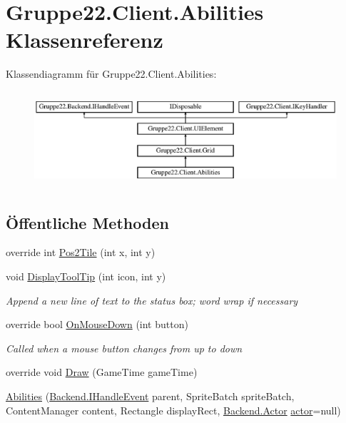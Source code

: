 \hypertarget{class_gruppe22_1_1_client_1_1_abilities}{\section{Gruppe22.\-Client.\-Abilities Klassenreferenz}
\label{class_gruppe22_1_1_client_1_1_abilities}
}
Klassendiagramm für Gruppe22.\-Client.\-Abilities\-:\begin{figure}[H]
\begin{center}
\leavevmode
\includegraphics[height=3.589744cm]{class_gruppe22_1_1_client_1_1_abilities}
\end{center}
\end{figure}
\subsection*{Öffentliche Methoden}
\begin{DoxyCompactItemize}
\item 
override int \hyperlink{class_gruppe22_1_1_client_1_1_abilities_a736694886772621f4ef219ad8ae83aa5}{Pos2\-Tile} (int x, int y)
\item 
void \hyperlink{class_gruppe22_1_1_client_1_1_abilities_a561619cabfbdf7e279889d3bbcfedb5a}{Display\-Tool\-Tip} (int icon, int y)
\begin{DoxyCompactList}\small\item\em Append a new line of text to the status box; word wrap if necessary \end{DoxyCompactList}\item 
override bool \hyperlink{class_gruppe22_1_1_client_1_1_abilities_ae3f148ccf966b0c8157b038c0489dfa3}{On\-Mouse\-Down} (int button)
\begin{DoxyCompactList}\small\item\em Called when a mouse button changes from up to down \end{DoxyCompactList}\item 
override void \hyperlink{class_gruppe22_1_1_client_1_1_abilities_a2514f092f1e04b34a57b78866836c642}{Draw} (Game\-Time game\-Time)
\item 
\hyperlink{class_gruppe22_1_1_client_1_1_abilities_a144f390381b22116a22b929d7bd247f4}{Abilities} (\hyperlink{interface_gruppe22_1_1_backend_1_1_i_handle_event}{Backend.\-I\-Handle\-Event} parent, Sprite\-Batch sprite\-Batch, Content\-Manager content, Rectangle display\-Rect, \hyperlink{class_gruppe22_1_1_backend_1_1_actor}{Backend.\-Actor} \hyperlink{class_gruppe22_1_1_client_1_1_abilities_ac07634e3f8f741d688861a0fca304b65}{actor}=null)
\end{DoxyCompactItemize}
